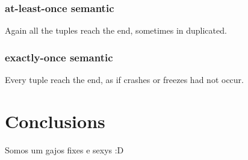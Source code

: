 \documentclass[times, 10pt,twocolumn]{article}
\begin{document}
\subsubsection{at-least-once semantic}
Again all the tuples reach the end, sometimes in duplicated.

\subsubsection{exactly-once semantic}
Every tuple reach the end, as if crashes or freezes had not occur.


\section{Conclusions}

Somos um gajos fixes e sexys :D

\nocite{ex1,ex2}


\end{document}
